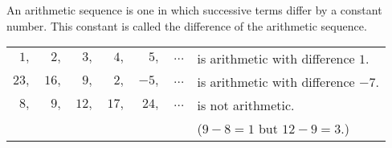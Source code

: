 \begin{frame}
\begin{definition}
An arithmetic sequence is one in which successive terms differ by a constant number.  
This constant is called the difference of the arithmetic sequence.  
\end{definition}

\begin{example}
\begin{tabular}{rrrrrcl}
$ 1,$ & $ 2,$ & $ 3,$ & $ 4,$ & $ 5,$ & $\ldots$ & is arithmetic with difference $1$. \\
$23,$ & $16,$ & $ 9,$ & $ 2,$ & $-5,$ & $\ldots$ & is arithmetic with difference $-7$. \\
$ 8,$ & $ 9,$ & $12,$ & $17,$ & $24,$ & $\ldots$ & is not arithmetic. \\
& & & & & & ($9-8=1$ but $12-9=3$.)
\end{tabular}
\end{example}
\end{frame}
